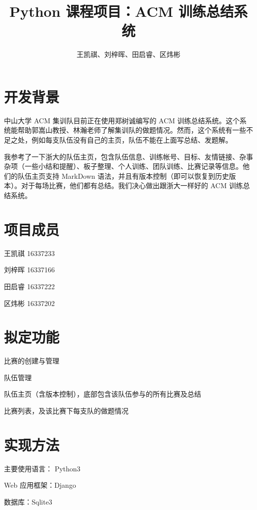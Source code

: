 \documentclass{article}
\begin{document}
\title{Python 课程项目：ACM 训练总结系统}
\author{王凯祺、刘梓晖、田启睿、区炜彬}
\maketitle

\section{开发背景}

中山大学 ACM 集训队目前正在使用郑树诚编写的 ACM 训练总结系统。这个系统能帮助郭嵩山教授、林瀚老师了解集训队的做题情况。然而，这个系统有一些不足之处，例如每支队伍没有自己的主页，队伍不能在上面写总结、发题解。

我参考了一下浙大的队伍主页，包含队伍信息、训练帐号、目标、友情链接、杂事杂项（一些小结和提醒）、板子整理、个人训练、团队训练、比赛记录等信息。他们的队伍主页支持 MarkDown 语法，并且有版本控制（即可以恢复到历史版本）。对于每场比赛，他们都有总结。我们决心做出跟浙大一样好的 ACM 训练总结系统。

\section{项目成员}

王凯祺 16337233

刘梓晖 16337166

田启睿 16337222

区炜彬 16337202

\section{拟定功能}

比赛的创建与管理

队伍管理

队伍主页（含版本控制），底部包含该队伍参与的所有比赛及总结

比赛列表，及该比赛下每支队的做题情况

\section{实现方法}

主要使用语言： Python3

Web 应用框架：Django

数据库：Sqlite3
\end{document}
